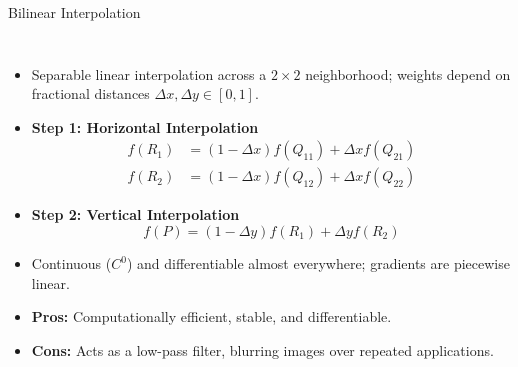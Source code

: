\documentclass[aspectratio=169,10pt]{beamer}
\begin{document}
\begin{frame}{Bilinear Interpolation}
\begin{columns}[T,onlytextwidth]
\small
\begin{itemize}
  \item Separable linear interpolation across a $2\times2$ neighborhood; weights depend on fractional distances $\Delta x, \Delta y \in [0, 1]$.
  
  \item \textbf{Step 1: Horizontal Interpolation}
  \begin{align*}
    f(R_1) &= (1-\Delta x)f(Q_{11}) + \Delta x f(Q_{21}) \\
    f(R_2) &= (1-\Delta x)f(Q_{12}) + \Delta x f(Q_{22})
  \end{align*}

  \item \textbf{Step 2: Vertical Interpolation}
  $$f(P) = (1-\Delta y)f(R_1) + \Delta y f(R_2)$$

  \item Continuous ($C^0$) and differentiable almost everywhere; gradients are piecewise linear.
  \item \textbf{Pros:} Computationally efficient, stable, and differentiable.
  \item \textbf{Cons:} Acts as a low-pass filter, blurring images over repeated applications.
\end{itemize}

\centering
{}
\end{columns}
\end{frame}
\end{document}
